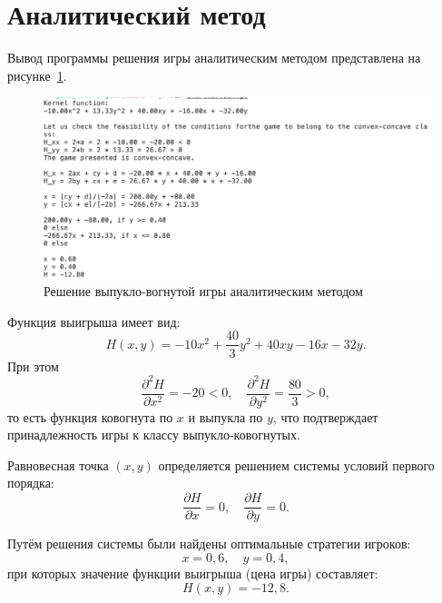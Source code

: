 \section{Аналитический метод}

Вывод программы решения игры аналитическим методом представлена на
рисунке~\ref{fig:fig1}.

\begin{figure}
  \centering
  \includegraphics[scale=0.5]{../../artifacts/lw2/analytical.png}
  \caption{Решение выпукло-вогнутой игры аналитическим методом}
  \label{fig:fig1}
\end{figure}


Функция выигрыша имеет вид:
\[
H(x,y) = -10x^2 + \frac{40}{3}y^2 + 40xy - 16x - 32y.
\]
При этом
\[
\frac{\partial^2 H}{\partial x^2} = -20 < 0, \quad \frac{\partial^2 H}{\partial y^2} = \frac{80}{3} > 0,
\]
то есть функция ковогнута по \(x\) и выпукла по \(y\), что подтверждает принадлежность игры к классу выпукло-ковогнутых.

Равновесная точка \((x,y)\) определяется решением системы условий первого порядка:
\[
\frac{\partial H}{\partial x}=0,\quad \frac{\partial H}{\partial y}=0.
\]

Путём решения системы были найдены оптимальные стратегии игроков:
\[
x = 0{,}6, \quad y = 0{,}4,
\]
при которых значение функции выигрыша (цена игры) составляет:
\[
H(x, y) = -12{,}8.
\]
